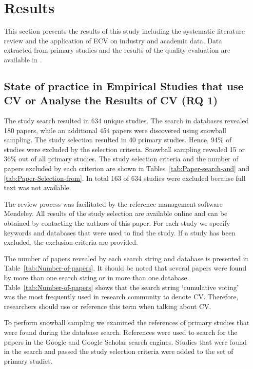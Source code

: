 \section{\label{results}Results}

This section presents the results of this study including the systematic literature review and the application of ECV on industry and academic data.
Data extracted from primary studies and the results of the quality evaluation are available in \cite{Rinkevics2011a}.

\subsection{State of practice in Empirical Studies that use CV or Analyse the Results of CV (RQ 1)\label{rq1}}

The study search resulted in 634 unique studies. The search in databases revealed 180 papers, while an additional 454 papers were discovered using snowball sampling.
The study selection resulted in 40 primary studies. Hence, 94\% of studies were excluded by the selection criteria.
Snowball sampling revealed 15 or 36\% out of all primary studies.
The study selection criteria and the number of papers excluded by each criterion are shown in Tables~\ref{tab:Paper-search-and} and \ref{tab:Paper-Selection-from}.
In total 163 of 634 studies were excluded because full text was not available.

The review process was facilitated by the reference management software Mendeley.
All results of the study selection are available online and can be obtained by contacting the authors of this paper.
For each study we specify keywords and databases that were used to find the study.
If a study has been excluded, the exclusion criteria are provided.

The number of papers revealed by each search string and database is
presented in Table~\ref{tab:Number-of-papers}. It should be noted
that several papers were found by more than one search string or in
more than one database. Table~\ref{tab:Number-of-papers} shows that
the search string `cumulative voting' was the most frequently used
in research community to denote CV. Therefore, researchers should use 
or reference this term when talking about CV.

To perform snowball sampling we examined the references of primary studies that were found during the database search.
References were used to search for the papers in the Google and Google Scholar search engines.
Studies that were found in the search and passed the study selection criteria were added to the set of primary studies.

